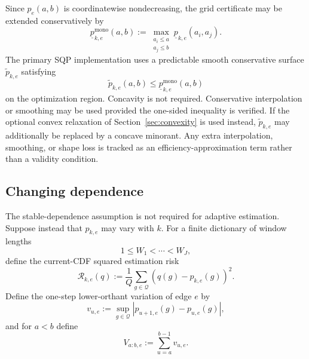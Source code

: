 \documentclass[11pt]{article}
\begin{document}
Since $p_e(a,b)$ is coordinatewise nondecreasing, the grid certificate may be
extended conservatively by
\begin{equation}
    \underline p^{\mathrm{mono}}_{k,e}(a,b)
    :=
    \max_{\substack{a_i\le a\\a_j\le b}}
    \underline p_{k,e}(a_i,a_j).
    \label{eq:monotone-edge-extension}
\end{equation}
The primary SQP implementation uses a predictable smooth conservative surface
$\widetilde p_{k,e}$ satisfying
\begin{equation}
    \widetilde p_{k,e}(a,b)
    \le
    \underline p^{\mathrm{mono}}_{k,e}(a,b)
    \label{eq:smooth-edge-underestimator}
\end{equation}
on the optimization region.  Concavity is not required.  Conservative
interpolation or smoothing may be used provided the one-sided inequality is
verified.  If the optional convex relaxation of Section~\ref{sec:convexity} is
used instead, $\widetilde p_{k,e}$ may additionally be replaced by a concave
minorant.  Any extra interpolation, smoothing, or shape loss is tracked as an
efficiency-approximation term rather than a validity condition.

\subsection{Changing dependence}

The stable-dependence assumption is not required for adaptive estimation.
Suppose instead that $p_{k,e}$ may vary with $k$.  For a finite dictionary of
window lengths
\[
    1\le W_1<\cdots<W_J,
\]
define the current-CDF squared estimation risk
\begin{equation}
    \mathcal R_{k,e}(q)
    :=
    \frac1Q
    \sum_{g\in\mathcal Q}
    \left(
        q(g)-p_{k,e}(g)
    \right)^2.
    \label{eq:edge-cdf-risk}
\end{equation}
Define the one-step lower-orthant variation of edge $e$ by
\begin{equation}
    v_{u,e}
    :=
    \sup_{g\in\mathcal Q}
    \left|
        p_{u+1,e}(g)-p_{u,e}(g)
    \right|,
    \label{eq:edge-one-step-variation}
\end{equation}
and for $a<b$ define
\begin{equation}
    V_{a:b,e}
    :=
    \sum_{u=a}^{b-1}v_{u,e}.
    \label{eq:edge-cumulative-variation}
\end{equation}
\end{document}
